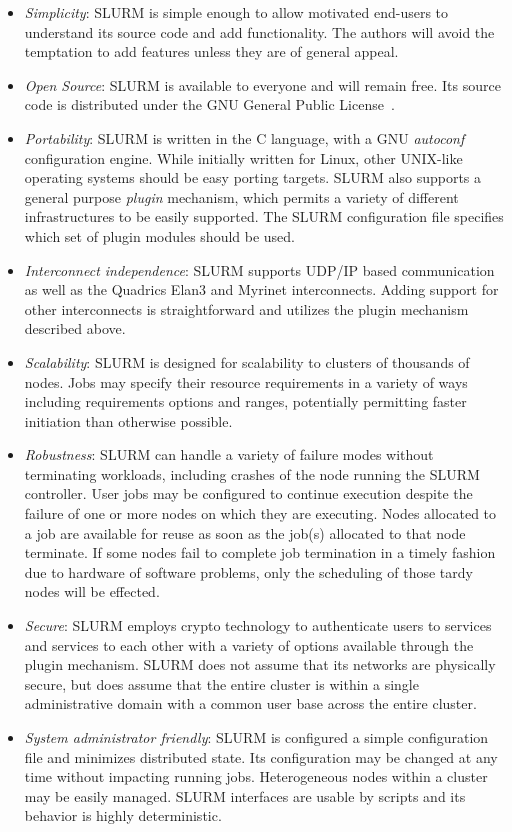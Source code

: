 \begin{itemize}
\item {\em Simplicity}: SLURM is simple enough to allow motivated end-users
to understand its source code and add functionality.  The authors will
avoid the temptation to add features unless they are of general appeal.

\item {\em Open Source}: SLURM is available to everyone and will remain free.
Its source code is distributed under the GNU General Public
License~\cite{GPLWeb}.

\item {\em Portability}: SLURM is written in the C language, with a GNU
{\em autoconf} configuration engine.
While initially written for Linux, other UNIX-like operating systems
should be easy porting targets.
SLURM also supports a general purpose {\em plugin} mechanism, which
permits a variety of different infrastructures to be easily supported.
The SLURM configuration file specifies which set of plugin modules
should be used.

\item {\em Interconnect independence}: SLURM supports UDP/IP based
communication as well as the Quadrics Elan3 and Myrinet interconnects.
Adding support for other interconnects is straightforward and utilizes
the plugin mechanism described above.

\item {\em Scalability}: SLURM is designed for scalability to clusters of
thousands of nodes.
Jobs may specify their resource requirements in a variety of ways
including requirements options and ranges, potentially permitting
faster initiation than otherwise possible.

\item {\em Robustness}: SLURM can handle a variety of failure modes
without terminating workloads, including crashes of the node running
the SLURM controller.
User jobs may be configured to continue execution despite the failure
of one or more nodes on which they are executing.
Nodes allocated to a job are available for reuse as soon as the job(s)
allocated to that node terminate.
If some nodes fail to complete job termination
in a timely fashion due to hardware of software problems, only the
scheduling of those tardy nodes will be effected.

\item {\em Secure}: SLURM employs crypto technology to authenticate
users to services and services to each other with a variety of options
available through the plugin mechanism.
SLURM does not assume that its networks are physically secure,
but does assume that the entire cluster is within a single
administrative domain with a common user base across the
entire cluster.

\item {\em System administrator friendly}: SLURM is configured a
simple configuration file and minimizes distributed state.
Its configuration may be changed at any time without impacting running jobs.
Heterogeneous nodes within a cluster may be easily managed.
SLURM interfaces are usable by scripts and its behavior is highly
deterministic.

\end{itemize}

